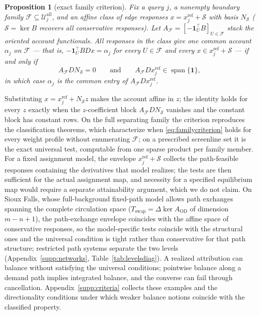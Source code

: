 \documentclass[a4paper,fleqn]{cas-sc}
\newtheorem{proposition}[theorem]{Proposition}
\begin{document}
\begin{proposition}[exact family criterion]\label{prop:familycriterion}
Fix a query $j$, a nonempty boundary family
$\mathcal F\subseteq\mathcal U_j^{\mathrm{all}}$, and an affine class of
edge responses $x=x_j^{\mathrm{ref}}+\mathcal S$ with basis $N_{\mathcal S}$
($\mathcal S=\ker B$ recovers all conservative responses). Let
$A_{\mathcal F}=[-\mathbf 1_U^\top B]_{U\in\mathcal F}$ stack the oriented
account functionals. All responses in the class give one common account
$\alpha_j$ on $\mathcal F$ --- that is,
$-\mathbf 1_U^\top BDx=\alpha_j$ for every $U\in\mathcal F$ and every
$x\in x_j^{\mathrm{ref}}+\mathcal S$ --- if and only if
\begin{equation}
A_{\mathcal F}DN_{\mathcal S}=0
\qquad\text{and}\qquad
A_{\mathcal F}Dx_j^{\mathrm{ref}}\in\operatorname{span}\{\mathbf 1\},
\label{eq:familycriterion}
\end{equation}
in which case $\alpha_j$ is the common entry of $A_{\mathcal F}Dx_j^{\mathrm{ref}}$.
\end{proposition}
Substituting $x=x_j^{\mathrm{ref}}+N_{\mathcal S}z$ makes the account
affine in $z$; the identity holds for every $z$ exactly when the
$z$-coefficient block $A_{\mathcal F}DN_{\mathcal S}$ vanishes and the
constant block has constant rows. On the full separating family the
criterion reproduces the classification theorems, which characterize
when \eqref{eq:familycriterion} holds for every weight profile without
enumerating $\mathcal F$; on a prescribed screenline set it is the exact
universal test, computable from one sparse product per family member.
For a fixed assignment model, the envelope
$x_j^{\mathrm{ref}}+\mathcal S$ collects the path-feasible responses
containing the derivatives that model realizes; the tests are then
sufficient for the actual assignment map, and necessity for a
specified equilibrium map would require a separate attainability
argument, which we do not claim. On Sioux Falls, whose full-background
fixed-path model allows path exchanges spanning the complete
circulation space ($T_{\mathrm{swap}}=\Delta\ker A_{\mathrm{OD}}$ of
dimension $m-n+1$), the path-exchange envelope coincides with the
affine space of conservative responses, so the model-specific tests
coincide with the structural ones and the universal condition is
tight rather than conservative for that path structure; restricted
path systems separate the two levels (Appendix~\ref{supp:networks},
Table~\ref{tab:levelsdiag}).
A realized attribution can balance without satisfying the universal
conditions; pointwise balance along a demand path implies integrated
balance, and the converse can fail through cancellation.
Appendix~\ref{supp:criteria} collects these examples and the
directionality conditions under which weaker balance notions coincide
with the classified property.
\end{document}
